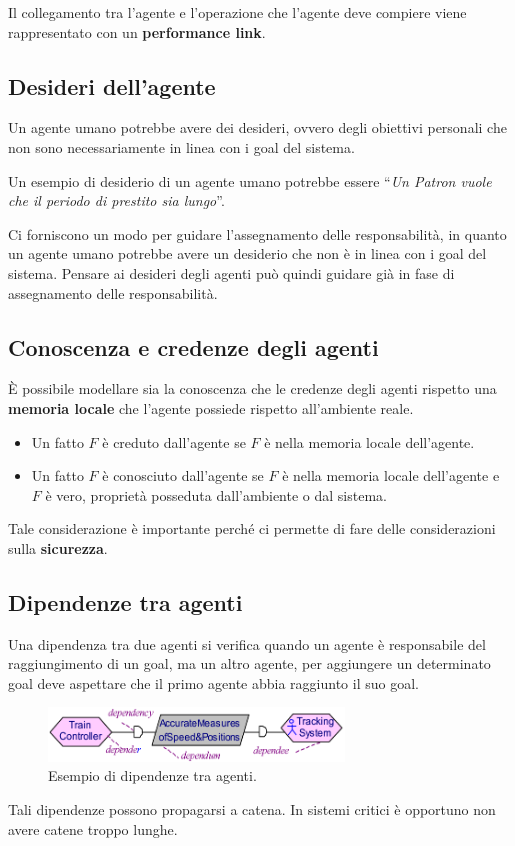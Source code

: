 Il collegamento tra l'agente e l'operazione che l'agente deve compiere viene
rappresentato con un \textbf{performance link}.

\subsection{Desideri dell'agente}
Un agente umano potrebbe avere dei desideri, ovvero degli obiettivi personali che
non sono necessariamente in linea con i goal del sistema.

Un esempio di desiderio di un agente umano potrebbe essere ``\textit{Un Patron 
vuole che il periodo di prestito sia lungo}''.

Ci forniscono un modo per guidare l'assegnamento delle responsabilità, in quanto
un agente umano potrebbe avere un desiderio che non è in linea con i goal del sistema.
Pensare ai desideri degli agenti può quindi guidare già in fase di assegnamento 
delle responsabilità.

\subsection{Conoscenza e credenze degli agenti}
È possibile modellare sia la conoscenza che le credenze degli agenti rispetto una 
\textbf{memoria locale} che l'agente possiede rispetto all'ambiente reale.

\begin{itemize}
    \item Un fatto $F$ è creduto dall'agente se $F$ è nella memoria locale dell'agente.
    \item Un fatto $F$ è conosciuto dall'agente se $F$ è nella memoria locale dell'agente e 
    $F$ è vero, proprietà posseduta dall'ambiente o dal sistema.
\end{itemize}
Tale considerazione è importante perché ci permette di fare delle considerazioni sulla 
\textbf{sicurezza}.
\subsection{Dipendenze tra agenti}
Una dipendenza tra due agenti si verifica quando un agente è responsabile del raggiungimento
di un goal, ma un altro agente, per aggiungere un determinato goal 
deve aspettare che il primo agente abbia raggiunto il suo goal.
\begin{figure}[H]
    \centering
    \includegraphics[width=0.7\textwidth]{img/dependent.png}
    \caption{Esempio di dipendenze tra agenti.}
    \label{fig:dependencies}
\end{figure}
Tali dipendenze possono propagarsi a catena. In sistemi critici è opportuno non 
avere catene troppo lunghe.
